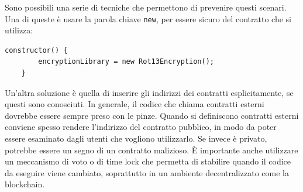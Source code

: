 Sono possibili una serie di tecniche che permettono di prevenire questi scenari. Una di queste è usare la parola chiave \texttt{new}, per essere sicuro del contratto che si utilizza:
\begin{lstlisting}
constructor() {
        encryptionLibrary = new Rot13Encryption();
    }
\end{lstlisting}
Un'altra soluzione è quella di inserire gli indirizzi dei contratti esplicitamente, se questi sono conosciuti. In generale, il codice che chiama contratti esterni dovrebbe essere sempre preso con le pinze. Quando si definiscono contratti esterni conviene spesso rendere l'indirizzo del contratto pubblico, in modo da poter essere esaminato dagli utenti che vogliono utilizzarlo. Se invece è privato, potrebbe essere un segno di un contratto malizioso. È importante anche utilizzare un meccanismo di voto o di time lock che permetta di stabilire quando il codice da eseguire viene cambiato, soprattutto in un ambiente decentralizzato come la blockchain.

\vspace{5mm}

